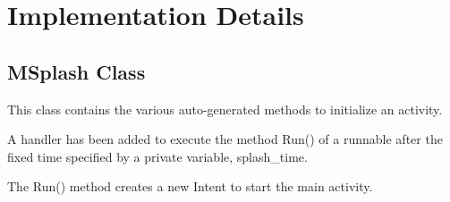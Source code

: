 \documentclass{article}
\begin{document}
\section{Implementation Details}
\subsection{MSplash Class}
\par\noindent This class contains the various auto-generated methods to initialize an activity.
\par\noindent A handler has been added to execute the method Run() of a runnable after the fixed time specified by a private variable, splash\_time.
\par\noindent The Run() method creates a new Intent to start the main activity.

\end{document}

